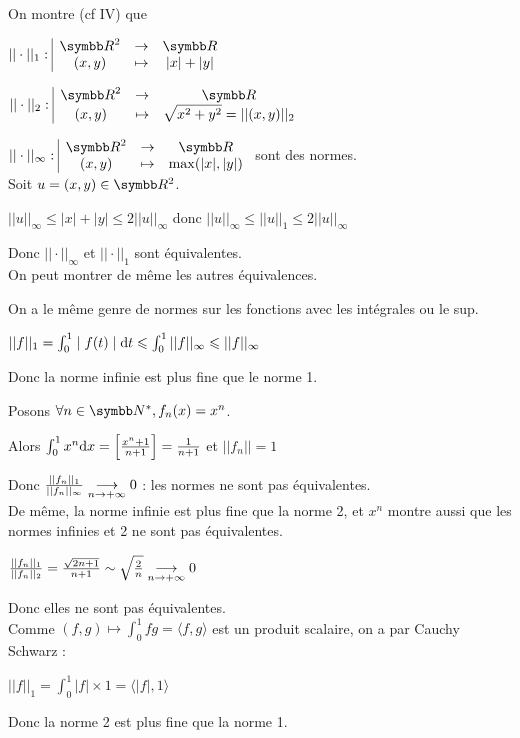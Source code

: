 \begin{exemple}
    On montre (cf IV) que 

    $\fonction{|| \cdot ||_1}{\R^2}{\R}{(x, y)}{|x| + |y|}$

    $\fonction{|| \cdot ||_2}{\R^2}{\R}{(x, y)}{\sqrt{x^2 + y^2} = ||(x, y)||_2}$

    $\fonction{|| \cdot ||_\infty}{\R^2}{\R}{(x, y)}{\max (|x|, |y|)}$
    sont des normes. \\

    Soit $u = (x, y) \in \R^2$. 

    $|| u ||_\infty \leqslant |x| + |y| \leqslant 2 ||u||_\infty$
    donc $|| u ||_\infty \leqslant ||u||_1 \leqslant 2 ||u||_\infty$

    Donc $|| \cdot ||_\infty$ et $|| \cdot ||_1$ sont équivalentes. \\

    On peut montrer de même les autres équivalences.
\end{exemple}

\begin{exemple}
    On a le même genre de normes sur les fonctions avec les intégrales ou le sup. 

    $|| f ||_1 = \int_{0}^{1} \mid f(t) \mid \text d t \leqslant \int_{0}^{1} ||f||_\infty \leqslant ||f ||_\infty$

    Donc la norme infinie est plus fine que le norme 1. 

    Posons $\forall n \in \N^*, f_n (x) = x^n$. 

    Alors $\int_{0}^{1} x^n \text d x = \left[\frac {x^n + 1}{n+ 1}\right] = \frac 1 {n + 1}$
    et $||f_n|| = 1$

    Donc $\frac{||f_n||_1}{||f_n||_\infty} \underset{n \to + \infty}{\longrightarrow} 0$ : les normes ne sont pas équivalentes. \\

    De même, la norme infinie est plus fine que la norme 2, et $x^n$ montre aussi 
    que les normes infinies et 2 ne sont pas équivalentes.

    $\frac{||f_n||_1}{||f_n||_2} = \frac{\sqrt{2n + 1}}{n+1} \sim \sqrt{\frac 2 n} \underset{n \to + \infty}{\longrightarrow} 0$

    Donc elles ne sont pas équivalentes. \\

    Comme $(f, g) \mapsto \int_{0}^{1}fg = \langle f, g \rangle$ est un produit scalaire, on 
    a par Cauchy Schwarz : 

    $||f||_1 = \int_{0}^{1} |f| \times 1 = \langle |f|, 1 \rangle$

        Donc la norme 2 est plus fine que la norme 1. 
\end{exemple}

